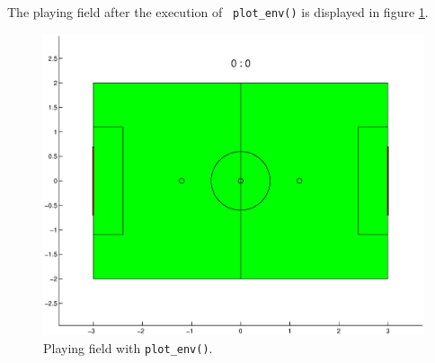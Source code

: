 The playing field after the execution of \texttt{ plot\_env()} is displayed in figure \ref{Playing_field}.

\begin{figure}[h]
	\centering
    	\includegraphics[width=12cm]{./2_Simulation/playing_field}
  	\caption{Playing field with \texttt{plot\_env()}.}
  	\label{Playing_field}
\end{figure}
\pagebreak[4]

